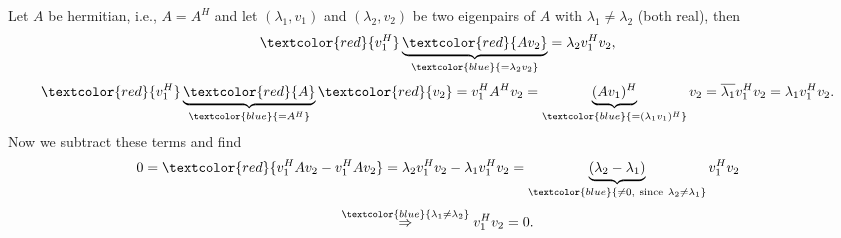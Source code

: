 {\begin{enumerate}
%	
	Let $A$ be hermitian, i.e., $A=A^H$ and let $(\lambda_1,v_1)$ and $(\lambda_2,v_2)$ be two eigenpairs of $A$ with $\lambda_1\neq\lambda_2$ (both real), then
	$$
	\textcolor{red}{v_1^H}\underbrace{\textcolor{red}{Av_2}}_{\textcolor{blue}{=\lambda_2v_2}} = \lambda_2v_1^Hv_2,
	$$ 
	$$ \textcolor{red}{v_1^H}\underbrace{\textcolor{red}{A}}_{\textcolor{blue}{=A^H}}\textcolor{red}{v_2} = v_1^HA^Hv_2= \underbrace{(Av_1)^H}_{\textcolor{blue}{=(\lambda_1v_1)^H}}  v_2= \overline{\lambda_1}v_1^Hv_2 = \lambda_1 v_1^Hv_2. 
	$$
	Now we subtract these terms and find 
	$$
	0=\textcolor{red}{v_1^HAv_2-v_1^HAv_2} = \lambda_2v_1^Hv_2 - \lambda_1v_1^Hv_2 = \underbrace{(\lambda_2-\lambda_1)}_{\textcolor{blue}{\neq 0,\  \text{since}\ \lambda_2\neq\lambda_1}}v_1^Hv_2
	$$
	$$
	\stackrel{\textcolor{blue}{\lambda_1\neq\lambda_2}}{\Rightarrow} v_1^Hv_2 = 0.
	$$
\end{enumerate}


}
